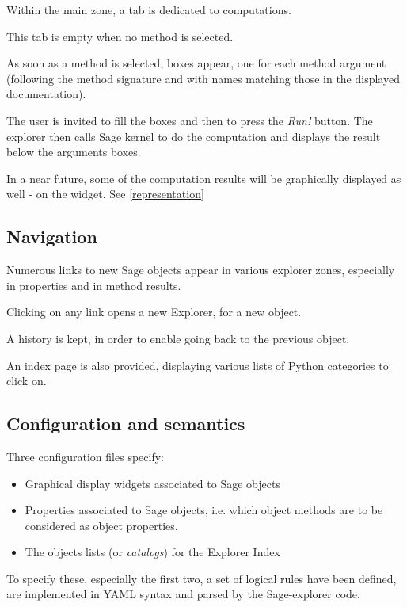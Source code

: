 \documentclass{deliverablereport}
\begin{document}
Within the main zone, a tab is dedicated to computations.

This tab is empty when no method is selected.

As soon as a method is selected, boxes appear, one for each method
argument (following the method signature and with names matching those
in the displayed documentation).

The user is invited to fill the boxes and then to press the
\emph{Run!} button. The explorer then calls Sage kernel to do the
computation and displays the result below the arguments boxes.

In a near future, some of the computation results will be graphically
displayed as well - on the widget. See \ref{representation}


\subsection{Navigation}

Numerous links to new Sage objects appear in various explorer zones,
especially in properties and in method results.

Clicking on any link opens a new Explorer, for a new object.

A history is kept, in order to enable going back to the previous object.

An index page is also provided, displaying various lists of Python
categories to click on.

\subsection{Configuration and semantics}
\label{semantics}

Three configuration files specify:

\begin{itemize}
\item Graphical display widgets associated to Sage objects
  \item Properties associated to Sage objects, i.e. which object methods are
    to be considered as object properties.
\item The objects lists (or \emph{catalogs}) for the Explorer Index
\end{itemize}

To specify these, especially the first two, a set of logical rules
have been defined, are implemented in YAML syntax and parsed by the
Sage-explorer code.
\end{document}
